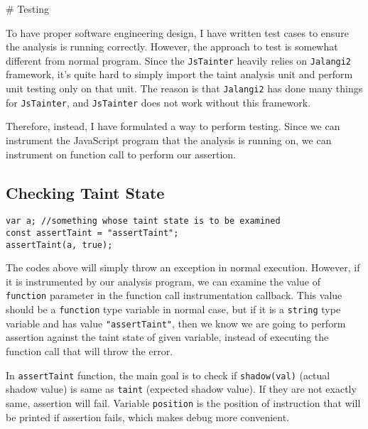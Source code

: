 # Testing

To have proper software engineering design, I have written test cases to ensure the analysis is running correctly. However, the approach to test is somewhat different from normal program. Since the \texttt{JsTainter} heavily relies on \texttt{Jalangi2} framework, it's quite hard to simply import the taint analysis unit and perform unit testing only on that unit. The reason is that \texttt{Jalangi2} has done many things for \texttt{JsTainter}, and \texttt{JsTainter} does not work without this framework.

Therefore, instead, I have formulated a way to perform testing. Since we can instrument the JavaScript program that the analysis is running on, we can instrument on function call to perform our assertion.

\subsection{Checking Taint State}

\begin{verbatim}
var a; //something whose taint state is to be examined
const assertTaint = "assertTaint";
assertTaint(a, true);
\end{verbatim}

The codes above will simply throw an exception in normal execution. However, if it is instrumented by our analysis program, we can examine the value of \texttt{function} parameter in the function call instrumentation callback. This value should be a \texttt{function} type variable in normal case, but if it is a \texttt{string} type variable and has value \texttt{"assertTaint"}, then we know we are going to perform assertion against the taint state of given variable, instead of executing the function call that will throw the error.

In \texttt{assertTaint} function, the main goal is to check if \texttt{shadow(val)} (actual shadow value) is same as \texttt{taint} (expected shadow value). If they are not exactly same, assertion will fail. Variable \texttt{position} is the position of instruction that will be printed if assertion fails, which makes debug more convenient.

